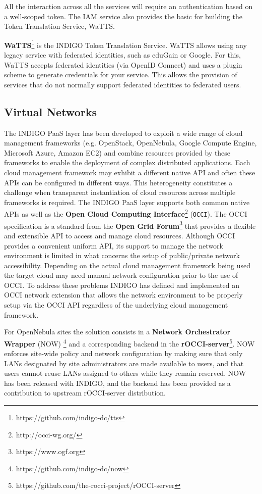\documentclass{article}
\begin{document}
All the interaction across all the services will require an authentication based on a well-scoped token. The IAM service also provides the basic for building the Token Translation Service, WaTTS.  

{\bf WaTTS}\footnote{https://github.com/indigo-dc/tts} is the INDIGO Token Translation Service. WaTTS allows using any legacy service with federated identities, such as eduGain or Google. For this, WaTTS accepts federated identities (via OpenID Connect) and uses a plugin scheme to generate credentials for your service. This allows the provision of services that do not normally support federated identities to federated users.




\subsection{Virtual Networks}


The INDIGO PaaS layer has been developed to exploit a wide range of cloud management frameworks (e.g. OpenStack, OpenNebula, Google Compute Engine, Microsoft Azure, Amazon EC2) and combine resources provided by these frameworks to enable the deployment of complex distributed applications. Each cloud management framework may exhibit a different native API and often these APIs can be configured in different ways. This heterogeneity constitutes a challenge when transparent instantiation of cloud resources across multiple frameworks is required. 
The INDIGO PaaS layer supports both common native APIs as well as the {\bf Open Cloud Computing Interface}\footnote{http://occi-wg.org/} ({\tt OCCI}). The OCCI specification is a standard from the {\bf Open Grid Forum}\footnote{https://www.ogf.org} that provides a flexible and extensible API to access and manage cloud resources. Although OCCI provides a convenient uniform API, its support to manage the network environment is limited in what concerns the setup of public/private network accessibility. Depending on the actual cloud management framework being used the target cloud may need manual network configuration prior to the use of OCCI. To address these problems INDIGO has defined and implemented an OCCI network extension that allows the network environment to be properly setup via the OCCI API regardless of the underlying cloud management framework.

For OpenNebula\cite{OPENNEBULA} sites the solution consists in a {\bf Network Orchestrator Wrapper} (NOW) \footnote{https://github.com/indigo-dc/now} and a corresponding backend in the {\bf rOCCI-server}\footnote{https://github.com/the-rocci-project/rOCCI-server}. NOW enforces site-wide policy and network configuration by making sure that only LANs designated by site administrators are made available to users, and that users cannot reuse LANs assigned to others while they remain reserved. NOW has been released with INDIGO, and the backend has been provided as a contribution to upstream rOCCI-server distribution.
\end{document}
